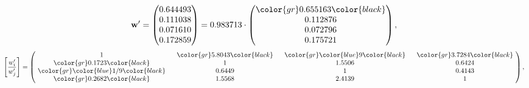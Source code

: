 \begin{example}
\begin{equation*}
\mathbf{w}^{\prime} =
\begin{pmatrix}
0.644493\\
0.111038\\
0.071610\\
0.172859
\end{pmatrix} =
0.983713\cdot
\begin{pmatrix}
\color{gr} 0.655163\color{black} \\
0.112876\\
0.072796\\
0.175721
\end{pmatrix},
\end{equation*}
\begin{equation*}
\left[ \frac{{w}^{\prime}_i}{{w}^{\prime}_j} \right] =
\begin{pmatrix}
$\,\,$ 1 $\,\,$ & $\,\,$\color{gr} 5.8043\color{black} $\,\,$ & $\,\,$\color{gr} \color{blue} 9\color{black} $\,\,$ & $\,\,$\color{gr} 3.7284\color{black} $\,\,$ \\
$\,\,$\color{gr} 0.1723\color{black} $\,\,$ & $\,\,$ 1 $\,\,$ & $\,\,$1.5506$\,\,$ & $\,\,$0.6424  $\,\,$ \\
$\,\,$\color{gr} \color{blue}  1/9\color{black} $\,\,$ & $\,\,$0.6449$\,\,$ & $\,\,$ 1 $\,\,$ & $\,\,$0.4143 $\,\,$ \\
$\,\,$\color{gr} 0.2682\color{black} $\,\,$ & $\,\,$1.5568$\,\,$ & $\,\,$2.4139$\,\,$ & $\,\,$ 1  $\,\,$ \\
\end{pmatrix},
\end{equation*}
\end{example}
\newpage
